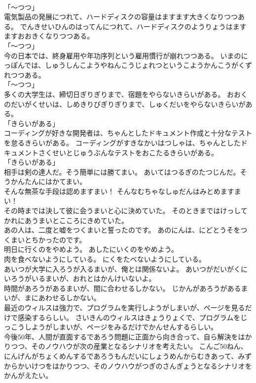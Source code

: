 \documentclass[8pt]{extreport}
\begin{document}
\begin{CJK}{UTF8}{min}
\\	「～つつ」	
\\	電気製品の発展につれて、ハードディスクの容量はますます大きくなりつつある。	でんきせいひんのはってんにつれて、ハードディスクのようりょうはますますおおきくなりつつある。	
\\	「～つつ」	
\\	今の日本では、終身雇用や年功序列という雇用慣行が崩れつつある。	いまのにっぽんでは、しゅうしんこようやねんこうじょれつというこようかんこうがくずれつつある。	
\\	「～つつ」	
\\	多くの大学生は、締切日ぎりぎりまで、宿題をやらないきらいがある。	おおくのだいがくせいは、しめきりびぎりぎりまで、しゅくだいをやらないきらいがある。	
\\	「きらいがある」	
\\	コーディングが好きな開発者は、ちゃんとしたドキュメント作成と十分なテストを怠るきらいがある。	コーディングがすきなかいはつしゃは、ちゃんとしたドキュメントさくせいとじゅうぶんなテストをおこたるきらいがある。	
\\	「きらいがある」	
\\	相手は剣の達人だ。そう簡単には勝てまい。	あいてはつるぎのたつじんだ。そうかんたんにはかてまい。	
\\	そんな無茶な手段は認めますまい！	そんなむちゃなしゅだんはみとめますまい！	
\\	その時までは決して彼に会うまいと心に決めていた。	そのときまではけっしてかれにあうまいとこころにきめていた。	
\\	あの人は、二度と嘘をつくまいと誓ったのです。	あのにんは、にどとうそをつくまいとちかったのです。	
\\	明日に行くのをやめよう。	あしたにいくのをやめよう。	
\\	肉を食べないようにしている。	にくをたべないようにしている。	
\\	あいつが大学に入ろうが入るまいが、俺とは関係ないよ。	あいつがだいがくにいろうがいるまいが、おれとはかんけいないよ。	
\\	時間があろうがあるまいが、間に合わせるしかない。	じかんがあろうがあるまいが、まにあわせるしかない。	
\\	最近のウィルスは強力で、プログラムを実行しようがしまいが、ページを見るだけで感染するらしい。	さいきんのウィルスはきょうりょくで、プログラムをじっこうしようがしまいが、ページをみるだけでかんせんするらしい。	
\\	今後50年、人間が直面するであろう問題に正面から向き合って、自ら解決をはかりつつ、そのノウハウが次の産業となるシナリオを考えたい。	こんご50ねん、にんげんがちょくめんするであろうもんだいにしょうめんからむきあって、みずからかいけつをはかりつつ、そのノウハウがつぎのさんぎょうとなるシナリオをかんがえたい。	

\end{CJK}
\end{document}

